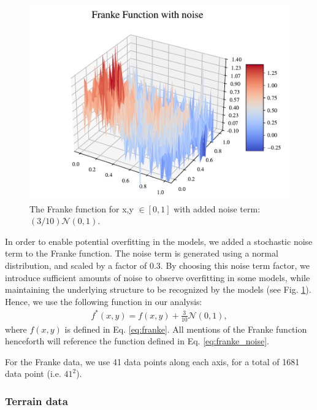 \begin{figure}[h!]
\centering
\includegraphics[width=1\linewidth]{project_1/figures/figures_in_report/franke_func_noise.pdf}
\caption{The Franke function for x,y $\in [0,1]$ with added noise term: $(3/10) \mathcal{N}(0, 1)$.}
\label{fig:franke_noise}
\end{figure}

In order to enable potential overfitting in the models, we added a stochastic noise term to the Franke function. The noise term is generated using a normal distribution, and scaled by a factor of $0.3$. By choosing this noise term factor, we introduce sufficient amounts of noise to observe overfitting in some models, while maintaining the underlying structure to be recognized by the models (see Fig. \ref{fig:franke_noise}). Hence, we use the following function in our analysis:
\begin{align}\label{eq:franke_noise}
    f^*(x,y) = f(x, y) + \frac{3}{10} \mathcal{N}(0, 1),
\end{align}
where $f(x,y)$ is defined in Eq. \ref{eq:franke}. All mentions of the Franke function henceforth will reference the function defined in Eq. \ref{eq:franke_noise}.

For the Franke data, we use 41 data points along each axis, for a total of 1681 data point (i.e. $41^2$).

\subsubsection{Terrain data}


